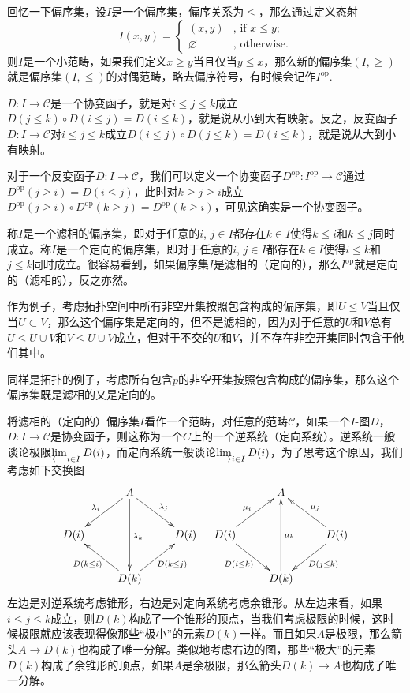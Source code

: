 \para 回忆一下偏序集，设$I$是一个偏序集，偏序关系为$\leq$，那么通过定义态射
\[
	{I}\left(x,y\right)=\begin{cases}
	(x,y)&\text{, if }x\leq y\text{;}\\
	\varnothing&\text{, otherwise}.
	\end{cases}
\]
则$I$是一个小范畴，如果我们定义$x\geq y$当且仅当$y\leq x$，那么新的偏序集$(I,\geq)$就是偏序集$(I,\leq)$的对偶范畴，略去偏序符号，有时候会记作$I^{\mathrm{op}}$.

$D:I\to \mathcal{C}$是一个协变函子，就是对$i\leq j\leq k$成立$D(j\leq k)\circ D(i\leq j)=D(i\leq k)$，就是说从小到大有映射。反之，反变函子$D:I\to \mathcal{C}$对$i\leq j\leq k$成立$D(i\leq j)\circ D(j\leq k)=D(i\leq k)$，就是说从大到小有映射。

对于一个反变函子$D:I\to \mathcal{C}$，我们可以定义一个协变函子$D^{\mathrm{op}} :I^{\mathrm{op}}\to \mathcal{C}$通过$D^{\mathrm{op}}(j\geq i)=D(i\leq j)$，此时对$k\geq j\geq i$成立$D^{\mathrm{op}}(j\geq i)\circ D^{\mathrm{op}}(k\geq j)=D^{\mathrm{op}}(k\geq i)$，可见这确实是一个协变函子。

\para 称$I$是一个滤相的偏序集，即对于任意的$i$, $j\in I$都存在$k\in I$使得$k\leq i$和$k\leq j$同时成立。称$I$是一个定向的偏序集，即对于任意的$i$, $j\in I$都存在$k\in I$使得$i\leq k$和$j\leq k$同时成立。很容易看到，如果偏序集$I$是滤相的（定向的），那么$I^{\mathrm{op}}$就是定向的（滤相的），反之亦然。

作为例子，考虑拓扑空间中所有非空开集按照包含构成的偏序集，即$U\leq V$当且仅当$U\subset V$，那么这个偏序集是定向的，但不是滤相的，因为对于任意的$U$和$V$总有$U\leq U\cup V$和$V\leq U\cup V$成立，但对于不交的$U$和$V$，并不存在非空开集同时包含于他们其中。

同样是拓扑的例子，考虑所有包含$p$的非空开集按照包含构成的偏序集，那么这个偏序集既是滤相的又是定向的。

\para 将滤相的（定向的）偏序集$I$看作一个范畴，对任意的范畴$\mathcal{C}$，如果一个$I$-图$D$，$D:I\to \mathcal{C}$是协变函子，则这称为一个$C$上的一个{逆系统}（{定向系统}）。逆系统一般谈论极限$\varprojlim_{i\in I} D(i)$，而定向系统一般谈论$\varinjlim_{i\in I} D(i)$，为了思考这个原因，我们考虑如下交换图
\[
	\xymatrix{
		&A \ar[dl]_{\lambda_{i}}\ar[dr]^{\lambda_{j}}\ar[dd]^{\lambda_{k}}&\\
		D(i)&&D(i)\\
		&D(k)\ar[ul]^{D(k\leq i)}\ar[ur]_{D(k\leq j)}&
	}
	\quad
	\xymatrix{
		&A &\\
		\ar[ur]^{\mu_{i}}D(i)\ar[dr]_{D(i\leq k)}&&D(i)\ar[ul]_{\mu_{j}}\ar[dl]^{D(j\leq k)}\\
		&D(k)\ar[uu]_{\mu_{k}}&
	}
\]
左边是对逆系统考虑锥形，右边是对定向系统考虑余锥形。从左边来看，如果$i\leq j\leq k$成立，则$D(k)$构成了一个锥形的顶点，当我们考虑极限的时候，这时候极限就应该表现得像那些“极小”的元素$D(k)$一样。而且如果$A$是极限，那么箭头$A\to D(k)$也构成了唯一分解。类似地考虑右边的图，那些“极大”的元素$D(k)$构成了余锥形的顶点，如果$A$是余极限，那么箭头$D(k)\to A$也构成了唯一分解。

